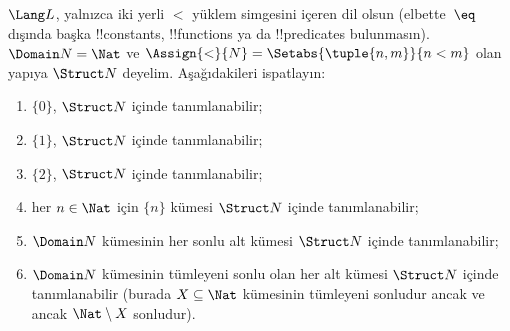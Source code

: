 \begin{prob}
$\Lang L$, yalnızca iki yerli $<$ yüklem simgesini içeren dil olsun
(elbette~$\eq$ dışında başka !!{constant}s, !!{function}s ya da
!!{predicate}s bulunmasın). $\Domain N=\Nat$ ve
$\Assign{<}{N}=\Setabs{\tuple{n,m}}{n<m}$ olan yapıya $\Struct N$
deyelim. Aşağıdakileri ispatlayın:
\begin{enumerate}
\item $\{0\}$, $\Struct N$ içinde tanımlanabilir;
\item $\{1\}$, $\Struct N$ içinde tanımlanabilir;
\item $\{2\}$, $\Struct N$ içinde tanımlanabilir;
\item her $n\in\Nat$ için $\{n\}$ kümesi $\Struct N$ içinde
  tanımlanabilir;
\item $\Domain N$ kümesinin her sonlu alt kümesi $\Struct N$ içinde
  tanımlanabilir;
\item $\Domain N$ kümesinin tümleyeni sonlu olan her alt kümesi
  $\Struct N$ içinde tanımlanabilir (burada $X\subseteq\Nat$ kümesinin
  tümleyeni sonludur ancak ve ancak $\Nat\setminus X$ sonludur).
\end{enumerate}
\end{prob}

